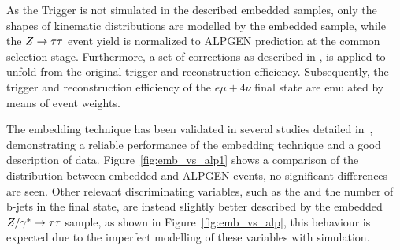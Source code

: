 

As the Trigger is not simulated in the described embedded samples, only the shapes of kinematic distributions are modelled by the embedded sample,
while the $Z\rightarrow \tau\tau$ event yield
is normalized to ALPGEN \Ztautau prediction at the common selection stage. Furthermore, a set of corrections as described in \cite{SMnew}, is
applied to unfold from the original \Zmumu trigger and reconstruction efficiency. Subsequently,
the trigger and reconstruction efficiency  of the $e \mu +4\nu $ final state are emulated by means of event weights.

The embedding technique has been validated in several studies detailed in~\cite{Embedding, SMnew},  demonstrating a reliable performance of the embedding technique
and a good description of data. Figure~\ref{fig:emb_vs_alp1} shows a comparison of the \mmc distribution between embedded and ALPGEN \Ztautau events,
no significant differences are seen. Other relevant discriminating variables, such as the \MET
and the number of b-jets in the final state, are instead slightly better described by the embedded $Z/\gamma^*\rightarrow \tau\tau$ sample, as shown in Figure~\ref{fig:emb_vs_alp},
this behaviour is expected due to the imperfect modelling of these variables with simulation.


